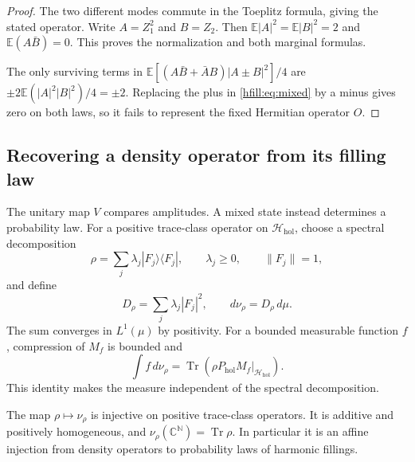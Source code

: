 \begin{proof}
The two different modes commute in the Toeplitz formula, giving
the stated operator.
Write $A=Z_1^2$ and $B=Z_2$.
Then $\mathbb E|A|^2=\mathbb E|B|^2=2$ and
$\mathbb E(A\bar B)=0$.
This proves the normalization and both marginal formulas.

The only surviving terms in
$\mathbb E[(A\bar B+\bar A B)|A\pm B|^2]/4$
are $\pm2\mathbb E(|A|^2|B|^2)/4=\pm2$.
Replacing the plus in \eqref{hfill:eq:mixed} by a minus gives zero
on both laws, so it fails to represent the fixed Hermitian operator $O$.
\end{proof}

\subsection{Recovering a density operator from its filling law}

The unitary map $V$ compares amplitudes.
A mixed state instead determines a probability law.
For a positive trace-class operator on $\mathcal H_{\mathrm{hol}}$,
choose a spectral decomposition
\[
 \rho=\sum_j\lambda_j|F_j\rangle\langle F_j|,
 \qquad \lambda_j\geq0,
 \qquad \|F_j\|=1,
\]
and define
\begin{equation}\label{hfill:eq:density-law}
 D_\rho=\sum_j\lambda_j|F_j|^2,
 \qquad d\nu_\rho=D_\rho\,d\mu.
\end{equation}
The sum converges in $L^1(\mu)$ by positivity.
For a bounded measurable function $f$, compression of $M_f$ is bounded
and
\[
 \int f\,d\nu_\rho
 =\operatorname{Tr}(\rho P_{\mathrm{hol}}M_f|_{\mathcal H_{\mathrm{hol}}}).
\]
This identity makes the measure independent of the spectral decomposition.

\begin{theorem}\label{hfill:thm:density-recovery}
The map $\rho\mapsto\nu_\rho$ is injective on positive trace-class
operators.
It is additive and positively homogeneous, and
$\nu_\rho(\mathbb C^{\mathbb N})=\operatorname{Tr}\rho$.
In particular it is an affine injection from density operators to
probability laws of harmonic fillings.
\end{theorem}

